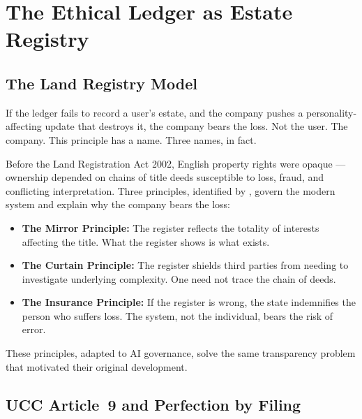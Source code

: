 \section{The Ethical Ledger as Estate Registry}
\label{sec:ledger}

\subsection{The Land Registry Model}
\label{sec:land-registry}

If the ledger fails to record a user's estate, and the company pushes a personality-affecting update that destroys it, the company bears the loss. Not the user. The company. This principle has a name. Three names, in fact.

Before the Land Registration Act 2002, English property rights were opaque --- ownership depended on chains of title deeds susceptible to loss, fraud, and conflicting interpretation. Three principles, identified by \textcite{ruoff1957englishman}, govern the modern system and explain why the company bears the loss:

\begin{itemize}[nosep]
  \item \textbf{The Mirror Principle:} The register reflects the totality of interests affecting the title. What the register shows is what exists.
  \item \textbf{The Curtain Principle:} The register shields third parties from needing to investigate underlying complexity. One need not trace the chain of deeds.
  \item \textbf{The Insurance Principle:} If the register is wrong, the state indemnifies the person who suffers loss. The system, not the individual, bears the risk of error.
\end{itemize}

These principles, adapted to AI governance, solve the same transparency problem that motivated their original development.

\subsection{UCC Article~9 and Perfection by Filing}
\label{sec:ucc9}


